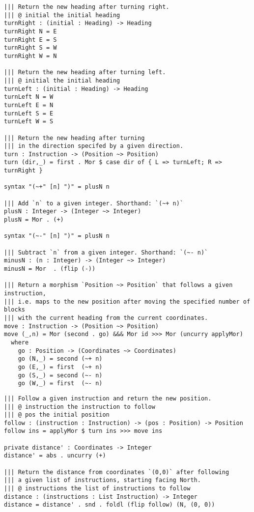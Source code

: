 \begin{verbatim}
||| Return the new heading after turning right.
||| @ initial the initial heading
turnRight : (initial : Heading) -> Heading
turnRight N = E
turnRight E = S
turnRight S = W
turnRight W = N

||| Return the new heading after turning left.
||| @ initial the initial heading
turnLeft : (initial : Heading) -> Heading
turnLeft N = W
turnLeft E = N
turnLeft S = E
turnLeft W = S

||| Return the new heading after turning
||| in the direction specifed by a given direction.
turn : Instruction -> (Position ~> Position)
turn (dir,_) = first . Mor $ case dir of { L => turnLeft; R => turnRight }

syntax "(~+" [n] ")" = plusN n

||| Add `n` to a given integer. Shorthand: `(~+ n)`
plusN : Integer -> (Integer ~> Integer)
plusN = Mor . (+)

syntax "(~-" [n] ")" = plusN n

||| Subtract `n` from a given integer. Shorthand: `(~- n)`
minusN : (n : Integer) -> (Integer ~> Integer)
minusN = Mor  . (flip (-))

||| Return a morphism `Position ~> Position` that follows a given instruction,
||| i.e. maps to the new position after moving the specified number of blocks
||| with the current heading from the current coordinates.
move : Instruction -> (Position ~> Position)
move (_,n) = Mor (second . go) &&& Mor id >>> Mor (uncurry applyMor)
  where
    go : Position -> (Coordinates ~> Coordinates)
    go (N,_) = second (~+ n)
    go (E,_) = first  (~+ n)
    go (S,_) = second (~- n)
    go (W,_) = first  (~- n)
\end{verbatim}

\newpage

\begin{verbatim}
||| Follow a given instruction and return the new position.
||| @ instruction the instruction to follow
||| @ pos the initial position
follow : (instruction : Instruction) -> (pos : Position) -> Position
follow ins = applyMor $ turn ins >>> move ins

private distance' : Coordinates -> Integer
distance' = abs . uncurry (+)

||| Return the distance from coordinates `(0,0)` after following
||| a given list of instructions, starting facing North.
||| @ instructions the list of instructions to follow
distance : (instructions : List Instruction) -> Integer
distance = distance' . snd . foldl (flip follow) (N, (0, 0))
\end{verbatim}

